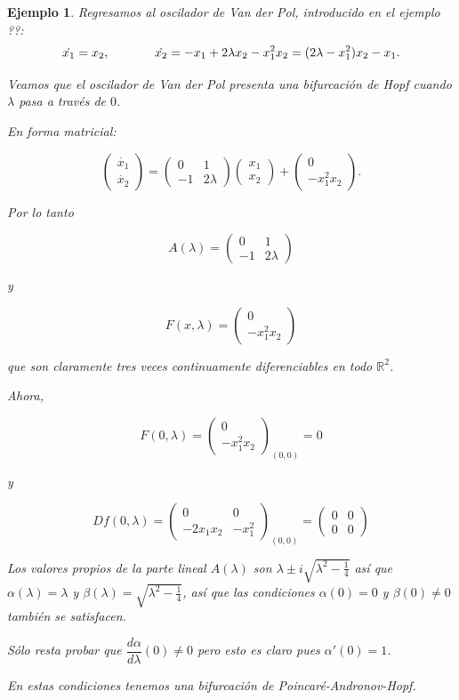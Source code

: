 \documentclass[11pt]{book}
\theoremstyle{definition}
\numberwithin{definition}{section}
\theoremstyle{theorem}
\numberwithin{theorem}{section}
\numberwithin{lemma}{section}
\numberwithin{corollary}{section}
\theoremstyle{plain}
\newtheorem{example}{Ejemplo}
\numberwithin{example}{section}
\newcommand{\R}{{\ensuremath{\mathbb{R}}}}
\begin{document}
\begin{example} \label{ex:vanderpol-hopf}
Regresamos al oscilador de Van der Pol, introducido en el ejemplo ??:
$$
	\dot{x_1} = x_2, \hspace{0.5in} \dot{x_2} = -x_1 + 2\lambda x_2 - x_1^2 x_2 = (2\lambda - x_1^2)x_2 - x_1.
$$

Veamos que el oscilador de Van der Pol presenta una bifurcación de Hopf cuando $\lambda$ pasa a través de $0$.

En forma matricial:

$$
	\begin{pmatrix}\dot{x_1} \\ \dot{x_2}\end{pmatrix} =	\begin{pmatrix}0 & 1 \\ -1 & 2\lambda \end{pmatrix} \begin{pmatrix}x_1 \\ x_2 \end{pmatrix} + \begin{pmatrix} 0 \\ -x_1^2 x_2\end{pmatrix}.
$$

Por lo tanto

$$
	A(\lambda) = \begin{pmatrix}0 & 1 \\ -1 & 2\lambda \end{pmatrix}
$$

y

$$
	F(x, \lambda) = \begin{pmatrix} 0 \\ -x_1^2 x_2\end{pmatrix}
$$

que son claramente tres veces continuamente diferenciables en todo $\R^2$.

Ahora,

$$F(0, \lambda) = \begin{pmatrix}0 \\ -x_1^2x_2\end{pmatrix}_{(0,0)} = 0 $$

y

$$ Df(0, \lambda) = \begin{pmatrix} 0 & 0 \\ -2x_1x_2 & -x_1^2 \end{pmatrix}_{(0,0)} = \begin{pmatrix}0 & 0 \\ 0 & 0\end{pmatrix}$$

Los valores propios de la parte lineal $A(\lambda)$ son $\lambda \pm i\sqrt{\lambda^2 - \frac{1}{4}}$ así que $\alpha(\lambda) = \lambda$ y $\beta(\lambda) = \sqrt{\lambda^2 - \frac{1}{4}}$, así que las condiciones $\alpha(0) = 0$ y $\beta(0) \neq 0$ también se satisfacen.

Sólo resta probar que $\dfrac{d \alpha}{d \lambda}(0) \neq 0$ pero esto es claro pues $\alpha'(0) = 1$.

En estas condiciones tenemos una bifurcación de Poincaré-Andronov-Hopf.
\end{example}
\end{document}
